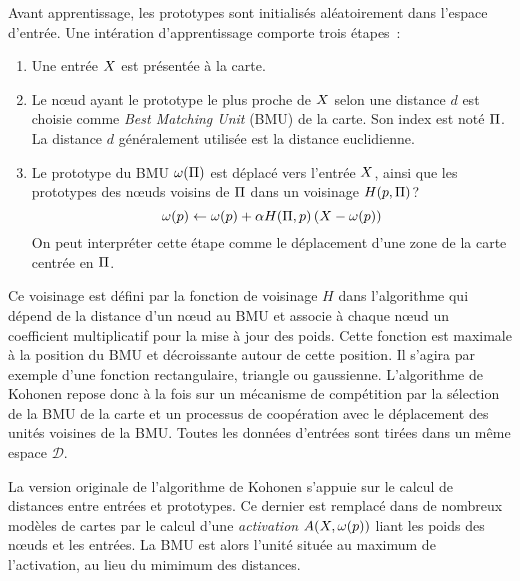 \documentclass[../main]{subfiles}
\begin{document}
Avant apprentissage, les prototypes sont initialisés aléatoirement dans l'espace d'entrée.
Une intération d'apprentissage comporte trois étapes~:
\begin{enumerate}
\item Une entrée $X$ est présentée à la carte.
\item Le n\oe{}ud ayant le prototype le plus proche de $X$ selon une distance $d$ est choisie comme \emph{Best Matching Unit} (BMU) de la carte. Son index est noté $\Pi$. La distance $d$ généralement utilisée est la distance euclidienne.
\item Le prototype du BMU $\omega(\Pi)$ est déplacé vers l'entrée $X$, ainsi que les prototypes des n\oe{}uds voisins de $\Pi$ dans un voisinage $H(p,\Pi)$?
$$ \omega(p) \leftarrow \omega(p) + \alpha H(\Pi,p) \left( X - \omega(p)\right)$$
On peut interpréter cette étape comme le déplacement d'une zone de la carte centrée en $\Pi$. 
\end{enumerate}

Ce voisinage est défini par la fonction de voisinage $H$ dans l'algorithme qui dépend de la distance d'un n\oe{}ud au BMU et associe à chaque n\oe{}ud un coefficient multiplicatif pour la mise à jour des poids. 
Cette fonction est maximale à la position du BMU et décroissante autour de cette position. Il s'agira par exemple d'une fonction rectangulaire, triangle ou gaussienne.
L'algorithme de Kohonen repose donc à la fois sur un mécanisme de compétition par la sélection de la BMU de la carte et un processus de coopération avec le déplacement des unités voisines de la BMU.
Toutes les données d'entrées sont tirées dans un même espace $\mathcal{D}$. 

La version originale de l'algorithme de Kohonen s'appuie sur le calcul de distances entre entrées et prototypes. Ce dernier est remplacé dans de nombreux modèles de cartes par le calcul d'une \emph{activation} $A(X, \omega(p))$ liant les poids des n\oe{}uds et les entrées. La BMU est alors l'unité située au maximum de l'activation, au lieu du mimimum des distances.
\end{document}
